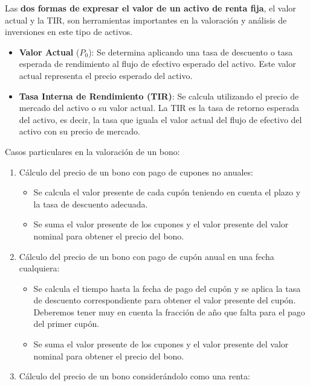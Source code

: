 \documentclass[
  letterpaper,
  DIV=11,
  numbers=noendperiod]{scrreprt}
\begin{document}
\begin{tcolorbox}
Las \textbf{dos formas de expresar el valor de un activo de renta fija},
el valor actual y la TIR, son herramientas importantes en la valoración
y análisis de inversiones en este tipo de activos.

\begin{itemize}
\item
  \textbf{Valor Actual} (\(P_0\)): Se determina aplicando una tasa de
  descuento o tasa esperada de rendimiento al flujo de efectivo esperado
  del activo. Este valor actual representa el precio esperado del
  activo.
\item
  \textbf{Tasa Interna de Rendimiento (TIR)}: Se calcula utilizando el
  precio de mercado del activo o su valor actual. La TIR es la tasa de
  retorno esperada del activo, es decir, la tasa que iguala el valor
  actual del flujo de efectivo del activo con su precio de mercado.
\end{itemize}

Casos particulares en la valoración de un bono:

\begin{enumerate}
\def\labelenumi{\arabic{enumi}.}
\item
  Cálculo del precio de un bono con pago de cupones no anuales:

  \begin{itemize}
  \item
    Se calcula el valor presente de cada cupón teniendo en cuenta el
    plazo y la tasa de descuento adecuada.
  \item
    Se suma el valor presente de los cupones y el valor presente del
    valor nominal para obtener el precio del bono.
  \end{itemize}
\item
  Cálculo del precio de un bono con pago de cupón anual en una fecha
  cualquiera:

  \begin{itemize}
  \item
    Se calcula el tiempo hasta la fecha de pago del cupón y se aplica la
    tasa de descuento correspondiente para obtener el valor presente del
    cupón. Deberemos tener muy en cuenta la fracción de año que falta
    para el pago del primer cupón.
  \item
    Se suma el valor presente de los cupones y el valor presente del
    valor nominal para obtener el precio del bono.
  \end{itemize}
\item
  Cálculo del precio de un bono considerándolo como una renta:


\end{enumerate}
\end{tcolorbox}
\end{document}

